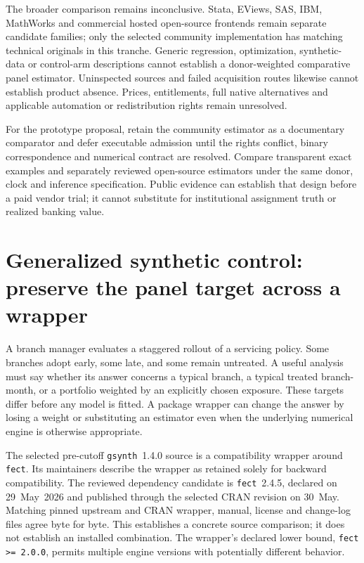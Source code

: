 The broader comparison remains inconclusive. Stata, EViews, SAS, IBM,
MathWorks and commercial hosted open-source frontends remain separate candidate
families; only the selected community implementation has matching technical
originals in this tranche. Generic regression, optimization, synthetic-data or
control-arm descriptions cannot establish a donor-weighted comparative panel
estimator. Uninspected sources and failed acquisition routes likewise cannot
establish product absence. Prices, entitlements, full native alternatives and
applicable automation or redistribution rights remain unresolved.

For the prototype proposal, retain the community estimator as a documentary
comparator and defer executable admission until the rights conflict, binary
correspondence and numerical contract are resolved. Compare transparent exact
examples and separately reviewed open-source estimators under the same donor,
clock and inference specification. Public evidence can establish that design
before a paid vendor trial; it cannot substitute for institutional assignment
truth or realized banking value.


\section{Generalized synthetic control: preserve the panel target across a wrapper}
\label{exec21:gsynth-scope}

A branch manager evaluates a staggered rollout of a servicing policy. Some
branches adopt early, some late, and some remain untreated. A useful analysis
must say whether its answer concerns a typical branch, a typical treated
branch-month, or a portfolio weighted by an explicitly chosen exposure.
These targets differ before any model is fitted. A package wrapper can change
the answer by losing a weight or substituting an estimator even when the
underlying numerical engine is otherwise appropriate.

The selected pre-cutoff \texttt{gsynth}~1.4.0 source is a compatibility
wrapper around \texttt{fect}. Its maintainers describe the wrapper as retained
solely for backward compatibility. The reviewed dependency candidate is
\texttt{fect}~2.4.5, declared on 29~May~2026 and published through the selected
CRAN revision on 30~May. Matching pinned upstream and CRAN wrapper, manual,
license and change-log files agree byte for byte. This establishes a concrete
source comparison; it does not establish an installed combination. The
wrapper's declared lower bound, \texttt{fect >= 2.0.0}, permits multiple engine
versions with potentially different behavior. \citep{exec21_gsynth_wrapper,exec21_gsynth_engine}

